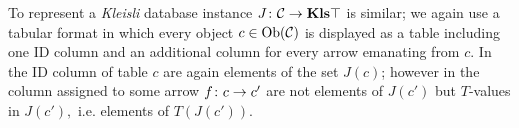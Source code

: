 \documentclass[CT4S-EN-RU]{subfiles}
\begin{document}
\begin{blockRUS}
\end{blockRUS}

\begin{blockENG}
To represent a {\em Kleisli} database instance $J\colon\mathcal{C}\rightarrow{\mathbf{Kls}}{\top}$ is similar; we again use a tabular format in which every object $c\in\textnormal{Ob}(\mathcal{C})$ is displayed as a table including one ID column and an additional column for every arrow emanating from $c.$ In the ID column of table $c$ are again elements of the set $J(c)$; however in the column assigned to some arrow $f\colon c\rightarrow c'$ are not elements of $J(c')$ but $T$-values in $J(c'),$ i.e. elements of $T(J(c')).$ 
\end{blockENG}

\begin{blockRUS}
\end{blockRUS}
\end{document}
